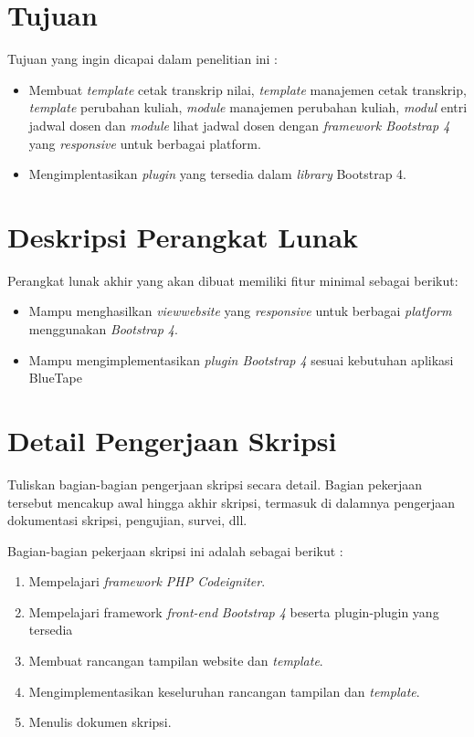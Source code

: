 \documentclass[a4paper,twoside]{article}
\begin{document}
\section{Tujuan}
Tujuan yang ingin dicapai dalam penelitian ini :

	\begin{itemize}	
	\item Membuat \textit{template} cetak transkrip nilai, \textit{template} manajemen cetak transkrip, \textit{template} perubahan kuliah, \textit{module} manajemen perubahan kuliah, \textit{modul} entri jadwal dosen dan \textit{module} lihat jadwal dosen dengan \textit{framework Bootstrap 4} yang \textit{responsive} untuk berbagai platform.
	\item Mengimplentasikan \textit{plugin} yang tersedia dalam \textit{library} Bootstrap 4.
	
		
\end{itemize}
	
		


\section{Deskripsi Perangkat Lunak}

Perangkat lunak akhir yang akan dibuat memiliki fitur minimal sebagai berikut:
\begin{itemize}
	\item Mampu menghasilkan \textit{view}\textit{website} yang \textit{responsive} untuk berbagai \textit{platform} menggunakan \textit{Bootstrap 4}.
	\item Mampu mengimplementasikan \textit{plugin Bootstrap 4} sesuai kebutuhan aplikasi BlueTape	
		
\end{itemize}

\section{Detail Pengerjaan Skripsi}
Tuliskan bagian-bagian pengerjaan skripsi secara detail. Bagian pekerjaan tersebut mencakup awal hingga akhir skripsi, termasuk di dalamnya pengerjaan dokumentasi skripsi, pengujian, survei, dll.

Bagian-bagian pekerjaan skripsi ini adalah sebagai berikut :
	\begin{enumerate}
		\item Mempelajari \textit{framework PHP Codeigniter}.
		\item Mempelajari framework \textit{front-end} \textit{Bootstrap 4} beserta plugin-plugin yang tersedia
		\item Membuat rancangan tampilan website dan \textit{template}.
		\item Mengimplementasikan keseluruhan rancangan tampilan dan \textit{template}.
		\item Menulis dokumen skripsi.
	\end{enumerate}
\end{document}
